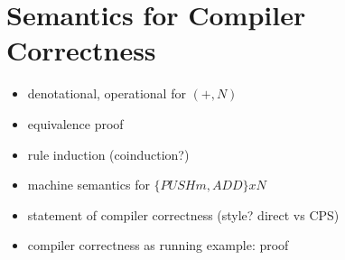 \chapter{Semantics for Compiler Correctness}

\begin{itemize}
\item denotational, operational for $(+,N)$
\item equivalence proof
\item rule induction (coinduction?)
\item machine semantics for $\{PUSH m, ADD\} x N$
\item statement of compiler correctness (style? direct vs CPS)
\item compiler correctness as running example: proof
\end{itemize}


